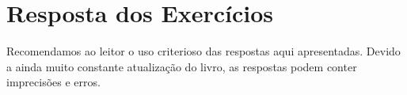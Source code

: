 
\chapter*{Resposta dos Exercícios}
\fancyhead[LE,RO]{\thepage}

Recomendamos ao leitor o uso criterioso das respostas aqui apresentadas. Devido a ainda muito constante atualização do livro, as respostas podem conter imprecisões e erros.
\shipoutAnswer
